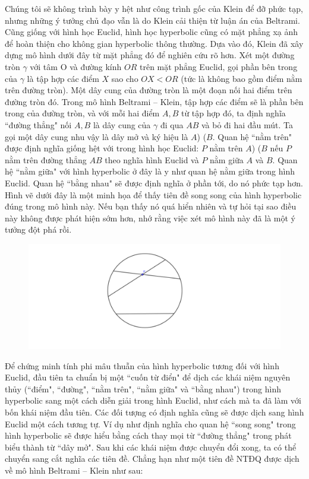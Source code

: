 \begin{multicols}{2}
	Chúng tôi sẽ không trình bày y hệt như công trình gốc của Klein để đỡ phức tạp, nhưng những ý tưởng chủ đạo vẫn là do Klein cải thiện từ luận án của Beltrami.
	Cũng giống với hình học Euclid, hình học hyperbolic cũng có mặt phẳng xạ ảnh để hoàn thiện cho không gian hyperbolic thông thường. Dựa vào đó, Klein đã xây dựng mô hình dưới đây từ mặt phẳng đó để nghiên cứu rõ hơn.
	Xét một đường tròn $\gamma$ với tâm O và đường kính $OR$ trên mặt phẳng Euclid, gọi phần bên trong của $ \gamma$ là tập hợp các điểm $X$ sao cho $OX < OR$ (tức là không bao gồm điểm nằm trên đường tròn). Một dây cung của đường tròn là một đoạn nối hai điểm trên đường tròn đó.
	Trong mô hình Beltrami -- Klein, tập hợp các điểm sẽ là phần bên trong của đường tròn, và với mỗi hai điểm $A, B$ từ tập hợp đó, ta định nghĩa ``đường thẳng" nối $A, B$ là dây cung của $ \gamma$ đi qua $AB$ và bỏ đi hai đầu mút. Ta gọi một dây cung nhu vậy là dây mở và ký hiệu là $A$) ($B$. Quan hệ ``nằm trên" được định nghĩa giống hệt với trong hình học Euclid: $P$ nằm trên $A$) ($B$ nếu $P$ nằm trên đường thẳng $AB$ theo nghĩa hình Euclid và $P$ nằm giữa $A$ và $B$. Quan hệ ``nằm giữa" với hình hyperbolic ở đây là y như quan hệ nằm giữa trong hình Euclid. Quan hệ ``bằng nhau" sẽ được định nghĩa ở phần tới, do nó phức tạp hơn.
	Hình vẽ dưới đây là một minh họa để thấy tiên đề song song của hình hyperbolic đúng trong mô hình này. Nếu bạn thấy nó quá hiển nhiên và tự hỏi tại sao điều này không được phát hiện sớm hơn, nhớ rằng việc xét mô hình này đã là một ý tưởng đột phá rồi. 
	\begin{figure}[H]
		\vspace*{-5pt}
		\centering
		\captionsetup{labelformat= empty, justification=centering}
		\includegraphics[width= 1\linewidth]{Hơn một đường song song.pdf}
		\vspace*{-10pt}
	\end{figure}
	Để chứng minh tính phi mâu thuẫn của hình hyperbolic tương đối với hình Euclid, đầu tiên ta chuẩn bị một ``cuốn từ điển" để dịch các khái niệm nguyên thủy (``điểm", ``đường", ``nằm trên", ``nằm giữa" và ``bằng nhau") trong hình hyperbolic sang một cách diễn giải trong hình Euclid, như cách mà ta đã làm với bốn khái niệm đầu tiên. Các đối tượng có định nghĩa cũng sẽ được dịch sang hình Euclid một cách tương tự. Ví dụ như định nghĩa cho quan hệ ``song song" trong hình hyperbolic sẽ được hiểu bằng cách thay mọi từ ``đường thẳng" trong phát biểu thành từ ``dây mở". Sau khi các khái niệm được chuyển đổi xong, ta có thể chuyển sang cắt nghĩa các tiên đề. Chẳng hạn như một tiên đề NTĐQ được dịch về mô hình Beltrami -- Klein như sau:

\end{multicols}
